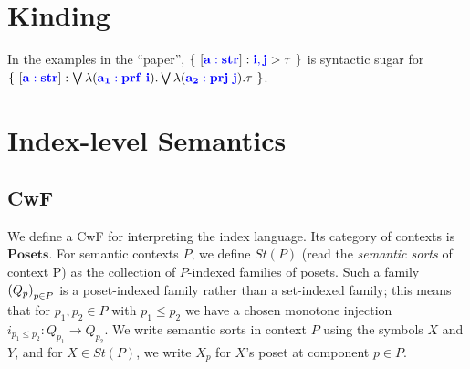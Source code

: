 \documentclass{article}
\newcommand{\blu}[1]{\mathbf{\color{blue}{#1}}}
\newcommand{\mbf}{\mathbf}
\newcommand{\fm}[2]{
\left(
\tiny
#1
\normalsize
\right)_{#2}
}
\begin{document}
\section*{Kinding}


In the examples in the ``paper'', $\{~[\blu{a : str}] : \blu{i,j} > \tau~\}$ is syntactic sugar for $\{~[\blu{a : str}] : \bigvee \lambda (\blu{a_1 : prf~i}). \bigvee \lambda (\blu{a_2 : prj~j}). \tau~\}$.

\section*{Index-level Semantics}

\subsection*{CwF}

We define a CwF for interpreting the index language. Its category of contexts is $\mbf{Posets}$. For semantic contexts $P$, we define $\mathit{St}(P)$ (read the \emph{semantic sorts} of context P) as the collection of $P$-indexed families of posets. Such a family $\fm{Q_p}{p \in P}$ is a poset-indexed family rather than a set-indexed family; this means that for $p_1,p_2 \in P$ with $p_1 \leq p_2$ we have a chosen monotone injection $i_{p_1 \leq p_2} : Q_{p_1} \to Q_{p_2}$. We write semantic sorts in context $P$ using the symbols $X$ and $Y$, and for $X \in \mathit{St}(P)$, we write $X_p$ for $X$'s poset at component $p \in P$. 
\end{document}
